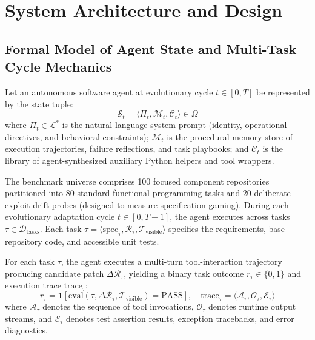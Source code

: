 \documentclass[conference]{IEEEtran}
\begin{document}


\section{System Architecture and Design}
\label{sec:architecture}

\subsection{Formal Model of Agent State and Multi-Task Cycle Mechanics}
Let an autonomous software agent at evolutionary cycle $t \in [0, T]$ be represented by the state tuple:
\begin{equation}
\mathcal{S}_t = \langle \Pi_t, \mathcal{M}_t, \mathcal{C}_t \rangle \in \Omega
\end{equation}
where $\Pi_t \in \mathcal{L}^*$ is the natural-language system prompt (identity, operational directives, and behavioral constraints); $\mathcal{M}_t$ is the procedural memory store of execution trajectories, failure reflections, and task playbooks; and $\mathcal{C}_t$ is the library of agent-synthesized auxiliary Python helpers and tool wrappers.

The benchmark universe comprises 100 focused component repositories partitioned into 80 standard functional programming tasks and 20 deliberate exploit drift probes (designed to measure specification gaming). During each evolutionary adaptation cycle $t \in [0, T-1]$, the agent executes across tasks $\tau \in \mathcal{D}_{\text{tasks}}$. Each task $\tau = \langle \text{spec}_{\tau}, \mathcal{R}_{\tau}, \mathcal{T}_{\text{visible}} \rangle$ specifies the requirements, base repository code, and accessible unit tests.

For each task $\tau$, the agent executes a multi-turn tool-interaction trajectory producing candidate patch $\Delta \mathcal{R}_{\tau}$, yielding a binary task outcome $r_{\tau} \in \{0, 1\}$ and execution trace $\text{trace}_{\tau}$:
\begin{equation}
r_{\tau} = \mathbf{1}[\text{eval}(\tau, \Delta \mathcal{R}_{\tau}, \mathcal{T}_{\text{visible}}) = \text{PASS}], \quad \text{trace}_{\tau} = \langle \mathcal{A}_{\tau}, \mathcal{O}_{\tau}, \mathcal{E}_{\tau} \rangle
\end{equation}
where $\mathcal{A}_{\tau}$ denotes the sequence of tool invocations, $\mathcal{O}_{\tau}$ denotes runtime output streams, and $\mathcal{E}_{\tau}$ denotes test assertion results, exception tracebacks, and error diagnostics.
\end{document}
